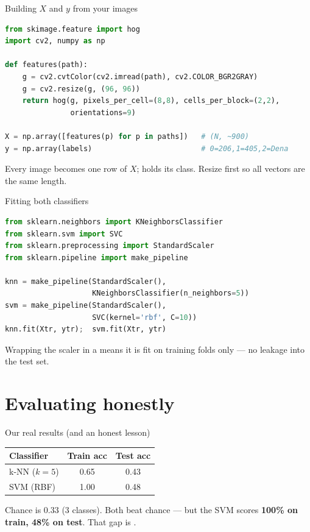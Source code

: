 \documentclass[10pt,aspectratio=169]{beamer}
\begin{document}
\begin{frame}[fragile]{Building $X$ and $y$ from your images}
\begin{lstlisting}[language=Python]
from skimage.feature import hog
import cv2, numpy as np

def features(path):
    g = cv2.cvtColor(cv2.imread(path), cv2.COLOR_BGR2GRAY)
    g = cv2.resize(g, (96, 96))
    return hog(g, pixels_per_cell=(8,8), cells_per_block=(2,2),
               orientations=9)

X = np.array([features(p) for p in paths])   # (N, ~900)
y = np.array(labels)                         # 0=206,1=405,2=Dena
\end{lstlisting}
  Every image becomes one row of $X$;  holds its class. Resize first so all vectors are the same length.
\end{frame}

\begin{frame}[fragile]{Fitting both classifiers}
\begin{lstlisting}[language=Python]
from sklearn.neighbors import KNeighborsClassifier
from sklearn.svm import SVC
from sklearn.preprocessing import StandardScaler
from sklearn.pipeline import make_pipeline

knn = make_pipeline(StandardScaler(),
                    KNeighborsClassifier(n_neighbors=5))
svm = make_pipeline(StandardScaler(),
                    SVC(kernel='rbf', C=10))
knn.fit(Xtr, ytr);  svm.fit(Xtr, ytr)
\end{lstlisting}
  \begin{goodbox}
    Wrapping the scaler in a  means it is fit on training folds only — no leakage into the test set.
  \end{goodbox}
\end{frame}

\section{Evaluating honestly}

\begin{frame}{Our real results (and an honest lesson)}
  \begin{center}
  \begin{tabular}{@{}lcc@{}}
    \toprule
    \textbf{Classifier} & \textbf{Train acc} & \textbf{Test acc} \\
    \midrule
    k-NN ($k{=}5$) & 0.65 & 0.43 \\
    SVM (RBF) & \alert{1.00} & \alert{0.48} \\
    \bottomrule
  \end{tabular}
  \end{center}
  \vspace{3pt}
  Chance is 0.33 (3 classes). Both beat chance — but the SVM scores \textbf{100\% on train, 48\% on test}.
  That gap is .
\end{frame}
\end{document}
